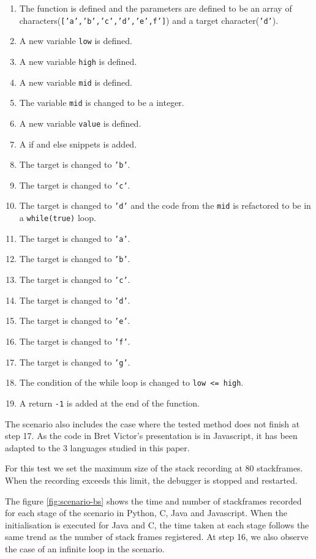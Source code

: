 \documentclass[english,submission]{programming}
\newcommand{\code}[1]{\colorbox{codegray}{\texttt{#1}}}
\begin{document}
\begin{enumerate}
  \item The function is defined and the parameters are defined to be an array of characters(\code{['a','b','c','d','e',f']}) and a target character(\code{'d'}).
  \item A new variable \code{low} is defined.
  \item A new variable \code{high} is defined.
  \item A new variable \code{mid} is defined.
  \item The variable \code{mid} is changed to be a integer.
  \item A new variable \code{value} is defined.
  \item A if and else snippets is added.
  \item The target is changed to \code{'b'}.
  \item The target is changed to \code{'c'}.
  \item The target is changed to \code{'d'} and the code from the \code{mid} is refactored to be in a \code{while(true)} loop.
  \item The target is changed to \code{'a'}.
  \item The target is changed to \code{'b'}.
  \item The target is changed to \code{'c'}.
  \item The target is changed to \code{'d'}.
  \item The target is changed to \code{'e'}.
  \item The target is changed to \code{'f'}.
  \item The target is changed to \code{'g'}.
  \item The condition of the while loop is changed to \code{low <= high}.
  \item A return \code{-1} is added at the end of the function.
\end{enumerate}


The scenario also includes the case where the tested method does not finish at step 17. As the code in Bret Victor's presentation is in Javascript, it has been adapted to the 3 languages studied in this paper.

For this test we set the maximum size of the stack recording at 80 stackframes. When the recording exceeds this limit, the debugger is stopped and restarted.

The figure \ref{fig:scenario-bs} shows the time and number of stackframes recorded for each stage of the scenario in Python, C, Java and Javascript. 
When the initialisation is executed for Java and C, the time taken at each stage follows the same trend as the number of stack frames registered. 
At step 16, we also observe the case of an infinite loop in the scenario.
\end{document}

